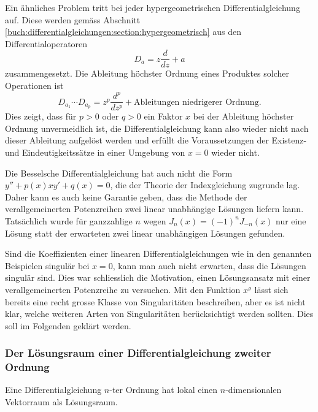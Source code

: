 Ein ähnliches Problem tritt bei jeder hypergeometrischen
Differentialgleichung auf.
Diese werden gemäss Abschnitt
\ref{buch:differentialgleichungen:section:hypergeometrisch}
aus den Differentialoperatoren
\[
D_a=z\frac{d}{dz} + a
\]
zusammengesetzt.
Die Ableitung höchster Ordnung eines Produktes solcher Operationen ist
\[
D_{a_1}
\cdots
D_{a_p}
=
z^p\frac{d^p}{dz^p} + \text{Ableitungen niedrigerer Ordnung}.
\]
Dies zeigt, dass für $p>0$ oder $q>0$ ein Faktor $x$ bei der
Ableitung höchster Ordnung unvermeidlich ist, die Differentialgleichung
kann also wieder nicht nach dieser Ableitung aufgelöst werden und
erfüllt die Voraussetzungen der Existenz- und Eindeutigkeitssätze
in einer Umgebung von $x=0$ wieder nicht.

Die Besselsche Differentialgleichung
hat auch nicht die Form $y''+p(x)xy'+q(x)=0$, die der Theorie der 
Indexgleichung zugrunde lag.
%
%
Daher kann es auch keine Garantie geben, dass die Methode der
verallgemeinerten Potenzreihen zwei linear unabhängige Lösungen
liefern kann.
Tatsächlich wurde für ganzzahlige $n$ wegen $J_n(x) = (-1)^n J_{-n}(x)$
nur eine Lösung statt der erwarteten zwei linear unabhängigen
Lösungen gefunden.

Sind die Koeffizienten einer linearen Differentialgleichungen wie
in den genannten Beispielen singulär bei $x=0$, kann man auch nicht
erwarten, dass die Lösungen singulär sind.
Dies war schliesslich die Motivation, einen Lösungsansatz mit einer
verallgemeinerten Potenzreihe zu versuchen.
Mit den Funktion $x^\varrho$ lässt sich bereits eine recht grosse
Klasse von Singularitäten beschreiben, aber es ist nicht klar,
welche weiteren Arten von Singularitäten berücksichtigt werden sollten.
Dies soll im Folgenden geklärt werden.

%
%
\subsubsection{Der Lösungsraum einer Differentialgleichung zweiter Ordnung}
Eine Differentialgleichung $n$-ter Ordnung hat lokal einen $n$-dimensionalen
Vektorraum als Lösungsraum.

